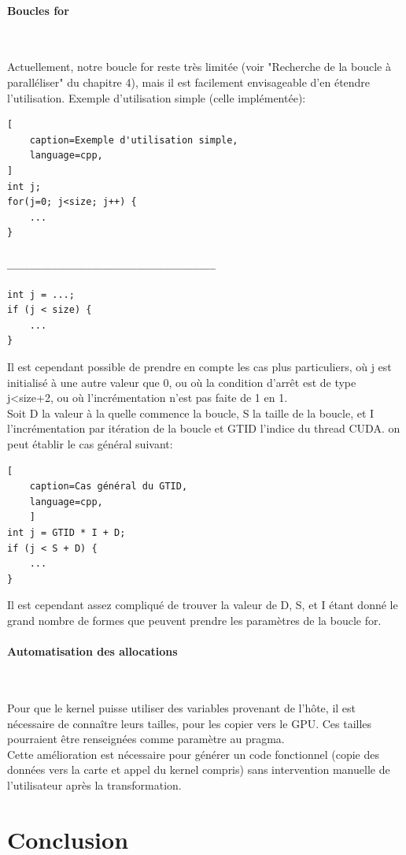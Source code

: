 \documentclass{article}
\begin{document}
	
	\paragraph{Boucles for}
	~~\\
	\indent
	
	Actuellement, notre boucle for reste très limitée (voir "Recherche de la boucle à paralléliser" du chapitre 4), mais il est facilement envisageable d'en étendre l'utilisation.
	Exemple d'utilisation simple (celle implémentée):
		\begin{lstlisting}[
	caption=Exemple d'utilisation simple,
    language=cpp,
]
int j;
for(j=0; j<size; j++) {
	...
}

_____________________________________

int j = ...;
if (j < size) {
	...
}
	\end{lstlisting}
	Il est cependant possible de prendre en compte les cas plus particuliers, où j est initialisé à une autre valeur que 0, ou où la condition d'arrêt est de type j\textless size+2, ou où l'incrémentation n'est pas faite de 1 en 1.
	\\Soit D la valeur à la quelle commence la boucle, S la taille de la boucle, et I l'incrémentation par itération de la boucle et GTID l'indice du thread CUDA. on peut établir le cas général suivant:
	\begin{lstlisting}[
	caption=Cas général du GTID,
    language=cpp,
    ]
int j = GTID * I + D;
if (j < S + D) {
	...
}
	\end{lstlisting}
	
	Il est cependant assez compliqué de trouver la valeur de D, S, et I étant donné le grand nombre de formes que peuvent prendre les paramètres de la boucle for.

	\paragraph{Automatisation des allocations}
	~~\\
	\indent
	
	Pour que le kernel puisse utiliser des variables provenant de l'hôte, il est nécessaire de connaître leurs tailles, pour les copier vers le GPU. Ces tailles pourraient être renseignées comme paramètre au pragma.\\
	 Cette amélioration est nécessaire pour générer un code fonctionnel (copie des données vers la carte et appel du kernel compris) sans intervention manuelle de l'utilisateur après la transformation.
\newpage
	\section{Conclusion}
	
\end{document}
